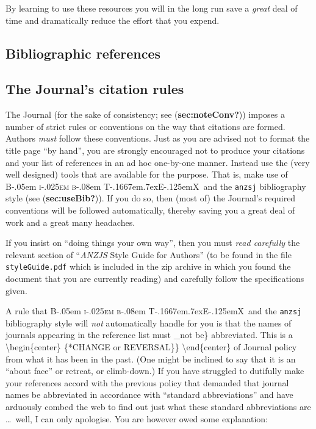 \documentclass[
  times,
  doublespace]{anzsauth}
\newcommand\BibTeX{{\rmfamily B\kern-.05em \textsc{i\kern-.025em b}\kern-.08em
T\kern-.1667em\lower.7ex\hbox{E}\kern-.125emX}}
\begin{document}
By learning to use these resources you will in the long run save a
\emph{great} deal of time and dramatically reduce the effort that you
expend.

\subsection{Bibliographic references}\label{sec:bibRef}

\subsection{The Journal's citation rules}\label{sec:citeRules}

The Journal (for the sake of consistency; see (\textbf{sec:noteConv?}))
imposes a number of strict rules or conventions on the way that
citations are formed. Authors \emph{must} follow these conventions. Just
as you are advised not to format the title page ``by hand'', you are
strongly encouraged not to produce your citations and your list of
references in an ad hoc one-by-one manner. Instead use the (very well
designed) tools that are available for the purpose. That is, make use of
\BibTeX~and the \texttt{anzsj} bibliography style (see
(\textbf{sec:useBib?})). If you do so, then (most of) the Journal's
required conventions will be followed automatically, thereby saving you
a great deal of work and a great many headaches.

If you insist on ``doing things your own way'', then you must \emph{read
carefully} the relevant section of ``\emph{ANZJS} Style Guide for
Authors'' (to be found in the file \texttt{styleGuide.pdf} which is
included in the zip archive in which you found the document that you are
currently reading) and carefully follow the specifications given.

A rule that \BibTeX~and the \texttt{anzsj} bibliography style will
\emph{not} automatically handle for you is that the names of journals
appearing in the reference list must \_not be\} abbreviated. This is a
\textbackslash begin\{center\} \{\large **CHANGE or REVERSAL\}\}
\textbackslash end\{center\} of Journal policy from what it has been in
the past. (One might be inclined to say that it is an ``about face'' or
retreat, or climb-down.) If you have struggled to dutifully make your
references accord with the previous policy that demanded that journal
names be abbreviated in accordance with ``standard abbreviations'' and
have arduously combed the web to find out just what these standard
abbreviations are \ldots~well, I can only apologise. You are however
owed some explanation:
\end{document}
